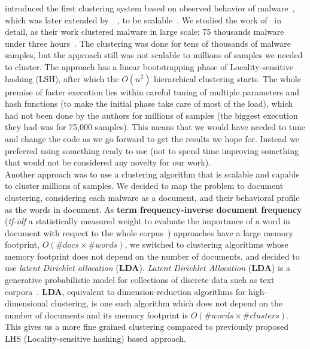 \citeauthor{bailey} introduced the first clustering system based on observed behavior of malware~\cite[]{bailey}, which was later extended by~\citeauthor{bayer}~\cite[]{bayer}, to be scalable~\cite[]{rieck2009automatic}.
We studied the work of~\citeauthor{bayer} in detail, as their work clustered malware in large scale; $75$ thousands malware under three hours~\cite[]{bayer}.
The clustering was done for tens of thousands of malware samples, but the approach still was not scalable to millions of samples we needed to cluster.
The approach has a linear bootstrapping phase of Locality-sensitive hashing (LSH), after which the $O(n^2)$ hierarchical clustering starts.
The whole premise of faster execution lies within careful tuning of multiple parameters and hash functions (to make the initial phase take care of most of the load), which had not been done by the authors for millions of samples (the biggest execution they had was for 75,000 samples).
This means that we would have needed to tune and change the code as we go forward to get the results we hope for.
Instead we preferred using something ready to use (not to spend time improving something that would not be considered any novelty for our work).
\\
Another approach was to use a clustering algorithm that is scalable and capable to cluster millions of samples.
We decided to map the problem to document clustering, considering each malware as a document, and their behavioral profile as the words in document.
As \textbf{term frequency-inverse document frequency} (\emph{tf-idf} a statistically measured weight to evaluate the importance of a word in document with respect to the whole corpus~\cite[]{tfidf}) approaches have a large memory footprint, $O(\#docs \times \#words)$, we switched to clustering algorithms whose memory footprint does not depend on the number of documents, and decided to use \textit{latent Dirichlet allocation} (\textbf{LDA}).
\textit{Latent Dirichlet Allocation} (\textbf{LDA}) is a generative probabilistic model for collections of discrete data such as text corpora~\cite[LDA]{Blei}.
\textbf{LDA}, equivalent to dimension-reduction algorithms for high-dimensional clustering, is one such algorithm which does not depend on the number of documents and its memory footprint is $O(\#words\times \#clusters)$.
This gives us a more fine grained clustering compared to previously proposed LHS (Locality-sensitive hashing) based approach.\\

